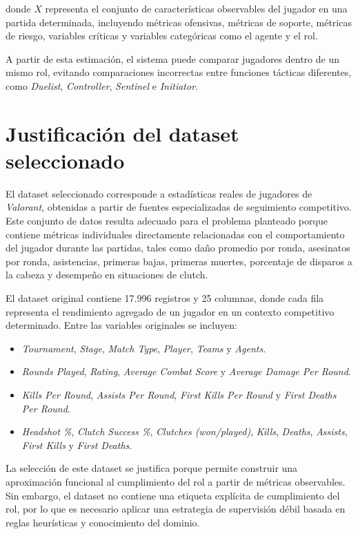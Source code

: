 \documentclass{ULBreport} %
\begin{document}
donde $X$ representa el conjunto de características observables del jugador en una partida determinada, incluyendo métricas ofensivas, métricas de soporte, métricas de riesgo, variables críticas y variables categóricas como el agente y el rol.

A partir de esta estimación, el sistema puede comparar jugadores dentro de un mismo rol, evitando comparaciones incorrectas entre funciones tácticas diferentes, como \textit{Duelist}, \textit{Controller}, \textit{Sentinel} e \textit{Initiator}.

\section{Justificación del dataset seleccionado}

El dataset seleccionado corresponde a estadísticas reales de jugadores de \textit{Valorant}, obtenidas a partir de fuentes especializadas de seguimiento competitivo. Este conjunto de datos resulta adecuado para el problema planteado porque contiene métricas individuales directamente relacionadas con el comportamiento del jugador durante las partidas, tales como daño promedio por ronda, asesinatos por ronda, asistencias, primeras bajas, primeras muertes, porcentaje de disparos a la cabeza y desempeño en situaciones de clutch.

El dataset original contiene 17.996 registros y 25 columnas, donde cada fila representa el rendimiento agregado de un jugador en un contexto competitivo determinado. Entre las variables originales se incluyen:

\begin{itemize}
    \item \textit{Tournament}, \textit{Stage}, \textit{Match Type}, \textit{Player}, \textit{Teams} y \textit{Agents}.
    \item \textit{Rounds Played}, \textit{Rating}, \textit{Average Combat Score} y \textit{Average Damage Per Round}.
    \item \textit{Kills Per Round}, \textit{Assists Per Round}, \textit{First Kills Per Round} y \textit{First Deaths Per Round}.
    \item \textit{Headshot \%}, \textit{Clutch Success \%}, \textit{Clutches (won/played)}, \textit{Kills}, \textit{Deaths}, \textit{Assists}, \textit{First Kills} y \textit{First Deaths}.
\end{itemize}

La selección de este dataset se justifica porque permite construir una aproximación funcional al cumplimiento del rol a partir de métricas observables. Sin embargo, el dataset no contiene una etiqueta explícita de cumplimiento del rol, por lo que es necesario aplicar una estrategia de supervisión débil basada en reglas heurísticas y conocimiento del dominio.
\end{document}

